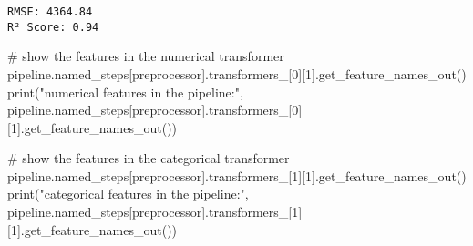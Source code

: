 \documentclass[
  letterpaper,
  DIV=11,
  numbers=noendperiod]{scrreprt}
\newenvironment{Shaded}{\begin{snugshade}}{\end{snugshade}}
\newcommand{\BuiltInTok}[1]{\textcolor[rgb]{0.00,0.23,0.31}{#1}}
\newcommand{\CommentTok}[1]{\textcolor[rgb]{0.37,0.37,0.37}{#1}}
\newcommand{\DecValTok}[1]{\textcolor[rgb]{0.68,0.00,0.00}{#1}}
\newcommand{\NormalTok}[1]{\textcolor[rgb]{0.00,0.23,0.31}{#1}}
\newcommand{\StringTok}[1]{\textcolor[rgb]{0.13,0.47,0.30}{#1}}
\begin{document}
\begin{verbatim}
RMSE: 4364.84
R² Score: 0.94
\end{verbatim}

\begin{Shaded}
\begin{Highlighting}[]
\CommentTok{\# show the features in the numerical transformer    }
\NormalTok{pipeline.named\_steps[}\StringTok{\textquotesingle{}preprocessor\textquotesingle{}}\NormalTok{].transformers\_[}\DecValTok{0}\NormalTok{][}\DecValTok{1}\NormalTok{].get\_feature\_names\_out()}
\BuiltInTok{print}\NormalTok{(}\StringTok{"numerical features in the pipeline:"}\NormalTok{, pipeline.named\_steps[}\StringTok{\textquotesingle{}preprocessor\textquotesingle{}}\NormalTok{].transformers\_[}\DecValTok{0}\NormalTok{][}\DecValTok{1}\NormalTok{].get\_feature\_names\_out())}

\CommentTok{\# show the features in the categorical transformer}
\NormalTok{pipeline.named\_steps[}\StringTok{\textquotesingle{}preprocessor\textquotesingle{}}\NormalTok{].transformers\_[}\DecValTok{1}\NormalTok{][}\DecValTok{1}\NormalTok{].get\_feature\_names\_out()}
\BuiltInTok{print}\NormalTok{(}\StringTok{"categorical features in the pipeline:"}\NormalTok{, pipeline.named\_steps[}\StringTok{\textquotesingle{}preprocessor\textquotesingle{}}\NormalTok{].transformers\_[}\DecValTok{1}\NormalTok{][}\DecValTok{1}\NormalTok{].get\_feature\_names\_out())}
\end{Highlighting}
\end{Shaded}
\end{document}
